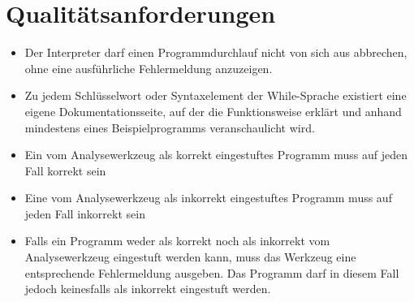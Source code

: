 \section{Qualitätsanforderungen}%

\begin{itemize}%
    \item Der Interpreter darf einen Programmdurchlauf nicht von sich aus abbrechen, ohne eine ausführliche Fehlermeldung anzuzeigen.
    \item Zu jedem Schlüsselwort oder Syntaxelement der While-Sprache existiert eine eigene Dokumentationsseite, auf der die Funktionsweise erklärt und anhand mindestens eines Beispielprogramms veranschaulicht wird.
    \item Ein vom Analysewerkzeug als korrekt eingestuftes Programm muss auf jeden Fall korrekt sein
    \item Eine vom Analysewerkzeug als inkorrekt eingestuftes Programm muss auf jeden Fall inkorrekt sein
    \item Falls ein Programm weder als korrekt noch als inkorrekt vom Analysewerkzeug eingestuft werden kann, muss das Werkzeug eine entsprechende Fehlermeldung ausgeben. Das Programm darf in diesem Fall jedoch keinesfalls als inkorrekt eingestuft werden.
\end{itemize}